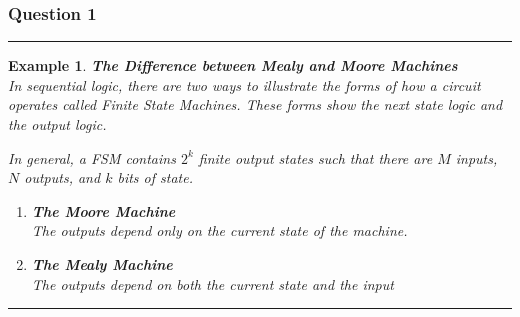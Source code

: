 \documentclass[12pt]{article}
\newtheorem{example}{Example}
\newenvironment{examp}
{
	\vspace{.5cm}
	\hrule
\begin{example}\upshape}
	{\hrule
		\vspace{0.5cm}
\end{example}}
\begin{document}
\subsubsection*{Question 1}
\begin{examp}
	\vspace{.5cm}
	\textbf{The Difference between Mealy and Moore Machines}\\
	In sequential logic, there are two ways to illustrate the forms of how a circuit
	operates called \textit{Finite State Machines}. These forms show the
	\textit{next state logic} and the \textit{output logic}.

	In general, a FSM contains \(2^k\) \textit{finite} output states such that
	there are \(M\) inputs, \(N\) outputs, and \(k\) bits of state.
	\begin{enumerate}
		\item \textbf{The Moore Machine}\\
		      The outputs depend only on the \textit{current state} of the machine.
		\item \textbf{The Mealy Machine}\\
		      The outputs depend on both the \textit{current} state and the \textit{input}
	\end{enumerate}
\end{examp}
\end{document}
